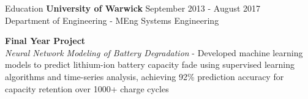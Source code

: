 \documentclass{resume} %
\begin{document}
\begin{rSection}{Education}
\smallbreak
{\bf University of Warwick} \hfill { September 2013 - August 2017}
\\ \normalfont Department of Engineering - MEng Systems Engineering

{\bf Final Year Project} \hfill
\\ \normalfont \textit{Neural Network Modeling of Battery Degradation} - Developed machine learning models to predict lithium-ion battery capacity fade using supervised learning algorithms and time-series analysis, achieving 92\% prediction accuracy for capacity retention over 1000+ charge cycles

\end{rSection}

\end{document}
